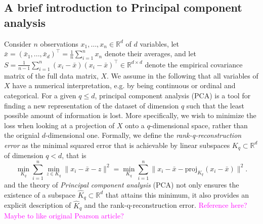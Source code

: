\documentclass[titlepage,11pt,twoside]{article}
\newcommand{\hl}[1]{\textcolor{magenta}{#1}}
\newcommand{\RR}{\mathbb{R}}
\begin{document}
\subsection{A brief introduction to Principal component analysis}
Consider $n$ observations $x_1,\dotsc,x_n \in \RR^d$ of $d$ variables, let $\bar{x} = (\bar{x}_1, ..., \bar{x}_d)^\top = \frac{1}{n} \sum_{i=1}^n x_n$ denote their averages, and let $S = \frac{1}{n-1} \sum_{i=1}^n (x_i-\bar{x}) (x_i-\bar{x})^\top \in \RR^{d \times d}$ denote the empirical covariance matrix of the full data matrix, $X$. We assume in the following that all variables of $X$ have a numerical interpretation, e.g. by being continuous or ordinal and categorical. For a given $q \leq d$, principal component analysis (PCA) is a tool for finding a new representation of the dataset of dimension $q$ such that the least possible amount of information is lost. More specifically, we wish to minimize the loss when looking at a projection of $X$ onto a $q$-dimensional space, rather than the orignial $d$-dimensional one. Formally, we define the \emph{rank-q-reconstruction error} as the minimal squared error that is achievable by linear subspaces $K_q \subset \RR^d$ of dimension $q < d$, that is
\begin{equation*}
\min_{K_q} \sum_{i=1}^n \min_{z \in K_q} \lVert x_i - \bar{x} - z \rVert^2 =
\min_{K_q} \sum_{i=1}^n \lVert x_i - \bar{x} - \text{proj}_{K_q}(x_i - \bar{x}) \rVert^2.
\end{equation*}
and the theory of \emph{Principal component analysis} (PCA) not only ensures the existence of a subspace $\hat{K}_q \subset \RR^d$ that attains this minimum, it also provides an explicit description of $\hat{K}_q$ and the rank-q-reconstruction error.  \hl{Reference here? Maybe to like original Pearson article?}
\end{document}
